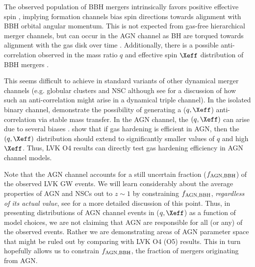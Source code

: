 The observed population of BBH mergers intrinsically favors positive effective spin \citep{Abbott+23-O3b}, implying formation channels bias spin directions towards alignment with BBH orbital angular momentum.
This is not expected from gas-free hierarchical merger channels, but can occur in the AGN channel as BH are torqued towards alignment with the gas disk over time \citep{Tagawa+20spin,Vajpeyi+22,McKernanFord24}.
Additionally, there is a possible anti-correlation observed in the mass ratio $q$ and effective spin $\Xeff$ distribution of BBH mergers \citep{Callister+21}.

This seems difficult to achieve in standard variants of other dynamical merger channels (e.g. globular clusters and NSC although see \citet{Su25} for a discussion of how such an anti-correlation might arise in a dynamical triple channel).
In the isolated binary channel, \citep[e.g.][]{Olejak+24,BanerjeeOlejak24} demonstrate the possibility of generating a ($q,\Xeff$) anti-correlation via stable mass transfer.
In the AGN channel, the $(q,\Xeff)$ can arise due to several biases \citep{Mckernan+22:q-Xeff,Santini+23, DittmannDempseyLi24}.
\citet{Vaccaro+24} show that if gas hardening is efficient in AGN, then the $(q,\Xeff)$ distribution should extend to significantly smaller values of $q$ and high $\Xeff$.
Thus, LVK O4 results can directly test gas hardening efficiency in AGN channel models.

Note that the AGN channel accounts for a still uncertain fraction ($f_{\rm AGN,BBH}$) of the observed LVK GW events.
We will learn considerably about the average properties of AGN and NSCs out to $z \sim 1$ by constraining $f_{\rm AGN, BBH}$, \emph{regardless of its actual value}, see \citet{FordMcKernan25} for a more detailed discussion of this point.
Thus, in presenting distributions of AGN channel events in ($q,\Xeff$) as a function of model choices, we are not claiming that AGN are responsible for all (or any) of the observed events.
Rather we are demonstrating areas of AGN parameter space that might be ruled out by comparing with LVK O4 (O5) results.
This in turn hopefully allows us to constrain $f_{\rm AGN,BBH}$, the fraction of mergers originating from AGN.




